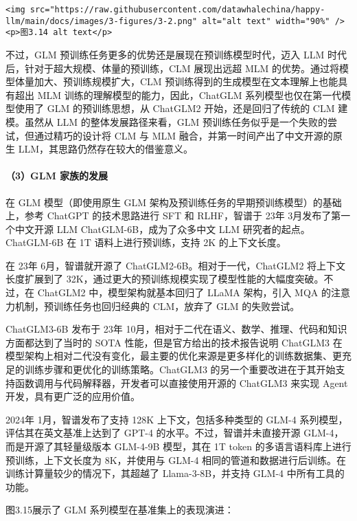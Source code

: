 \documentclass[
]{article}
\begin{document}
\begin{verbatim}
<img src="https://raw.githubusercontent.com/datawhalechina/happy-llm/main/docs/images/3-figures/3-2.png" alt="alt text" width="90%" />
<p>图3.14 alt text</p>
\end{verbatim}

不过，GLM 预训练任务更多的优势还是展现在预训练模型时代，迈入 LLM
时代后，针对于超大规模、体量的预训练，CLM 展现出远超 MLM
的优势。通过将模型体量加大、预训练规模扩大，CLM
预训练得到的生成模型在文本理解上也能具有超出 MLM
训练的理解模型的能力，因此，ChatGLM 系列模型也仅在第一代模型使用了 GLM
的预训练思想，从 ChatGLM2 开始，还是回归了传统的 CLM 建模。虽然从 LLM
的整体发展路径来看，GLM
预训练任务似乎是一个失败的尝试，但通过精巧的设计将 CLM 与 MLM
融合，并第一时间产出了中文开源的原生 LLM，其思路仍然存在较大的借鉴意义。

\paragraph{（3）GLM
家族的发展}\label{glm-ux5bb6ux65cfux7684ux53d1ux5c55}

在 GLM 模型（即使用原生 GLM
架构及预训练任务的早期预训练模型）的基础上，参考 ChatGPT 的技术思路进行
SFT 和 RLHF，智谱于 23年 3月发布了第一个中文开源 LLM
ChatGLM-6B，成为了众多中文 LLM 研究者的起点。ChatGLM-6B 在 1T
语料上进行预训练，支持 2K 的上下文长度。

在 23年 6月，智谱就开源了 ChatGLM2-6B。相对于一代，ChatGLM2
将上下文长度扩展到了
32K，通过更大的预训练规模实现了模型性能的大幅度突破。不过，在 ChatGLM2
中，模型架构就基本回归了 LLaMA 架构，引入 MQA
的注意力机制，预训练任务也回归经典的 CLM，放弃了 GLM 的失败尝试。

ChatGLM3-6B 发布于 23年
10月，相对于二代在语义、数学、推理、代码和知识方面都达到了当时的 SOTA
性能，但是官方给出的技术报告说明 ChatGLM3
在模型架构上相对二代没有变化，最主要的优化来源是更多样化的训练数据集、更充足的训练步骤和更优化的训练策略。ChatGLM3
的另一个重要改进在于其开始支持函数调用与代码解释器，开发者可以直接使用开源的
ChatGLM3 来实现 Agent 开发，具有更广泛的应用价值。

2024年 1月，智谱发布了支持 128K 上下文，包括多种类型的 GLM-4
系列模型，评估其在英文基准上达到了 GPT-4 的水平。不过，智谱并未直接开源
GLM-4，而是开源了其轻量级版本 GLM-4-9B 模型，其在 1T token
的多语言语料库上进行预训练，上下文长度为 8K，并使用与 GLM-4
相同的管道和数据进行后训练。在训练计算量较少的情况下，其超越了
Llama-3-8B，并支持 GLM-4 中所有工具的功能。

图3.15展示了 GLM 系列模型在基准集上的表现演进：
\end{document}
